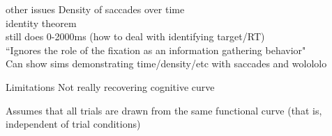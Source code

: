 \documentclass{beamer}
\begin{document}
\begin{frame}{other issues}
Density of saccades over time \newline \\
identity theorem \newline \\
still does 0-2000ms (how to deal with identifying target/RT) \newline \\
``Ignores the role of the fixation as an information gathering behavior" \newline \\

Can show sims demonstrating time/density/etc with saccades and  wolololo
\end{frame}



\begin{frame}{Limitations}
Not really recovering cognitive curve \newline 

Assumes that all trials are drawn from the same functional curve (that is, independent of trial conditions) \newline 



\end{frame}
\end{document}
